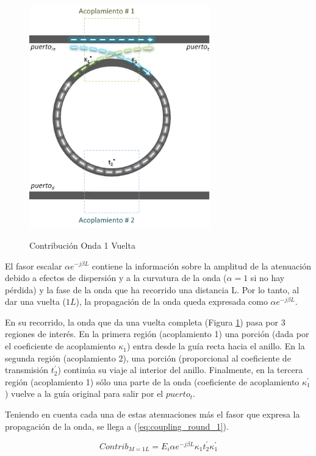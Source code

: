 \begin{figure}[h!]
\caption{Contribución Onda 1 Vuelta}
\centering
\includegraphics[width=0.7\textwidth,natwidth=397,natheight=490]{figs/rr_n1.PNG}
\label{fig:rr_n1}
\end{figure} 

El fasor escalar $\alpha e^{-j \beta L}$ contiene la información sobre la amplitud de
la atenuación debido a efectos de dispersión y a la curvatura de la onda 
($\alpha=1$ si no hay pérdida)
y la fase de la onda que ha recorrido una distancia L. 
Por lo tanto, al dar una vuelta ($1L$), la propagación de la onda queda expresada como 
$\alpha e^{-j \beta L}$.

En su recorrido, la onda que da una vuelta completa (Figura \ref{fig:rr_n1}) 
pasa por 3 regiones de interés. 
En la primera región (acoplamiento 1) una porción (dada por el coeficiente de acoplamiento 
$\kappa_1$) entra desde la guía recta hacia el anillo.
En la segunda región (acoplamiento 2), una porción (proporcional al coeficiente de transmisión 
$t_2^{'}$) continúa su viaje al interior del anillo.
Finalmente, en la tercera región (acoplamiento 1) sólo una parte de la onda 
(coeficiente de acoplamiento $\kappa_1^{'}$) vuelve a la guía original para 
salir por el $puerto_t$. 


Teniendo en cuenta cada una de estas atenuaciones más el fasor que expresa la propagación
de la onda, se llega a (\ref{eq:coupling_round_1}).

\begin{equation}
Contrib_{M=1L} = E_i \alpha e^{-j \beta L} \kappa_1 t_2^{'} \kappa_1^{'}
\label{eq:coupling_round_1}
\end{equation} 

